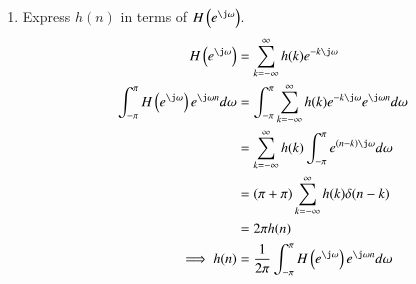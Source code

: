 \documentclass[journal,12pt,twocolumn]{IEEEtran}
\renewcommand\thesection{\arabic{section}}
\begin{document}
\begin{enumerate}[label=\thesection.\arabic*]
\begin{figure}[!ht]
\label{fig:dtft}
\end{figure}
\\
\item Express $h(n)$ in terms of $H\brak{e^{\j \omega}}$.\\
\solution 
\begin{align}
    H\brak{e^{\j \omega}}&= \sum_{k=-\infty}^{\infty} h(k) e^{-k\j \omega}\\
    \int_{-\pi}^{\pi}H\brak{e^{\j \omega}}e^{\j\omega n}d\omega&= \int_{-\pi}^{\pi}\sum_{k=-\infty}^{\infty} h(k) e^{-k\j \omega}e^{\j\omega n}d\omega\\
    &= \sum_{k=-\infty}^{\infty}h(k)\int_{-\pi}^{\pi}e^{\brak{n-k}\j  \omega}d\omega\\
    &=(\pi+\pi)\sum_{k=-\infty}^{\infty}h(k)\delta(n-k)\\
    &= 2\pi h(n)\\
    \implies h(n) &= \frac{1}{2\pi}\int_{-\pi}^{\pi}H\brak{e^{\j \omega}}e^{\j\omega n}d\omega
\end{align}
\end{enumerate}


\newcommand\showdiv[1]{\overline{\smash{\hstretch{0.5}{)}\mkern-3.2mu\hstretch{0.5}{)}}#1}}
\end{document}
